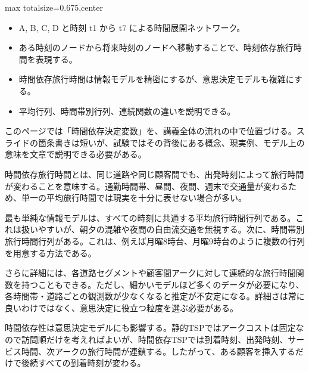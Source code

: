 \clearpage
{}
\begin{adjustbox}{max totalsize={\textwidth}{0.675\textheight},center}
\begin{minipage}{\textwidth}\scriptsize
\begin{minipage}[t]{0.485\textwidth}
\begin{itemize}
\item A, B, C, D と時刻 t1 から t7 による時間展開ネットワーク。
\item ある時刻のノードから将来時刻のノードへ移動することで、時刻依存旅行時間を表現する。
\end{itemize}
\begin{itemize}
\item 時間依存旅行時間は情報モデルを精密にするが、意思決定モデルも複雑にする。
\item 平均行列、時間帯別行列、連続関数の違いを説明できる。
\end{itemize}
\end{minipage}\hfill
\begin{minipage}[t]{0.485\textwidth}
このページでは「時間依存決定変数」を、講義全体の流れの中で位置づける。スライドの箇条書きは短いが、試験ではその背後にある概念、現実例、モデル上の意味を文章で説明できる必要がある。\par
時間依存旅行時間とは、同じ道路や同じ顧客間でも、出発時刻によって旅行時間が変わることを意味する。通勤時間帯、昼間、夜間、週末で交通量が変わるため、単一の平均旅行時間では現実を十分に表せない場合が多い。\par
最も単純な情報モデルは、すべての時刻に共通する平均旅行時間行列である。これは扱いやすいが、朝夕の混雑や夜間の自由流交通を無視する。次に、時間帯別旅行時間行列がある。これは、例えば月曜8時台、月曜9時台のように複数の行列を用意する方法である。\par
さらに詳細には、各道路セグメントや顧客間アークに対して連続的な旅行時間関数を持つこともできる。ただし、細かいモデルほど多くのデータが必要になり、各時間帯・道路ごとの観測数が少なくなると推定が不安定になる。詳細さは常に良いわけではなく、意思決定に役立つ粒度を選ぶ必要がある。\par
時間依存性は意思決定モデルにも影響する。静的TSPではアークコストは固定なので訪問順だけを考えればよいが、時間依存TSPでは到着時刻、出発時刻、サービス時間、次アークの旅行時間が連鎖する。したがって、ある顧客を挿入するだけで後続すべての到着時刻が変わる。\par

\end{minipage}
\end{minipage}
\end{adjustbox}
